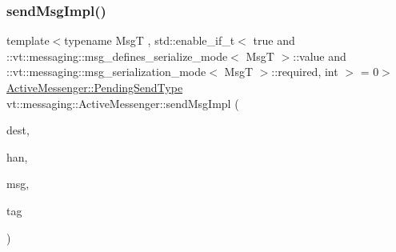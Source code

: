 \mbox{\label{structvt_1_1messaging_1_1_active_messenger_aae60feeb3e184a5a77d9be6e7c43d91a}} 
\subsubsection{\texorpdfstring{send\+Msg\+Impl()}{sendMsgImpl()}\hspace{0.1cm}{\footnotesize\ttfamily [2/4]}}
{\footnotesize\ttfamily template$<$typename MsgT , std\+::enable\+\_\+if\+\_\+t$<$ true and \+::vt\+::messaging\+::msg\+\_\+defines\+\_\+serialize\+\_\+mode$<$ Msg\+T $>$\+::value and \+::vt\+::messaging\+::msg\+\_\+serialization\+\_\+mode$<$ Msg\+T $>$\+::required, int $>$  = 0$>$ \\
\hyperlink{structvt_1_1messaging_1_1_active_messenger_a3626a6ca76d8ad4ec7c3b47a2c70d3a8}{Active\+Messenger\+::\+Pending\+Send\+Type} vt\+::messaging\+::\+Active\+Messenger\+::send\+Msg\+Impl (\begin{DoxyParamCaption}\item[{\hyperlink{namespacevt_a866da9d0efc19c0a1ce79e9e492f47e2}{Node\+Type}}]{dest,  }\item[{\hyperlink{namespacevt_af64846b57dfcaf104da3ef6967917573}{Handler\+Type}}]{han,  }\item[{\hyperlink{structvt_1_1messaging_1_1_msg_shared_ptr}{Msg\+Shared\+Ptr}$<$ MsgT $>$ \&}]{msg,  }\item[{\hyperlink{namespacevt_a84ab281dae04a52a4b243d6bf62d0e52}{Tag\+Type}}]{tag }\end{DoxyParamCaption})\hspace{0.3cm}{\ttfamily [inline]}}

\mbox{\label{structvt_1_1messaging_1_1_active_messenger_aae60feeb3e184a5a77d9be6e7c43d91a}} 
